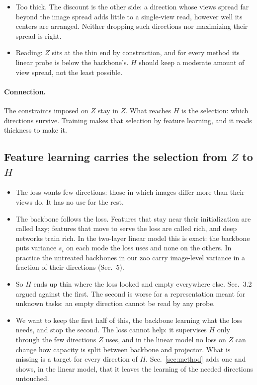 \documentclass[11pt]{article}
\numberwithin{equation}{section}
\theoremstyle{definition}
\theoremstyle{remark}
\begin{document}
\begin{itemize}
    \item Too thick. The discount is the other side: a direction whose views spread far
    beyond the image spread adds little to a single-view read, however well its centers are
    arranged. Neither dropping such directions nor maximizing their spread is right.

    \item Reading: \(Z\) sits at the thin end by construction, and for every method its
    linear probe is below the backbone's. \(H\) should keep a moderate amount of view
    spread, not the least possible.
\end{itemize}

\paragraph{Connection.}
The constraints imposed on \(Z\) stay in \(Z\). What reaches \(H\) is the selection:
which directions survive. Training makes that selection by feature learning, and it reads
thickness to make it.


\subsection{Feature learning carries the selection from \(Z\) to \(H\)}
\begin{itemize}
    \item The loss wants few directions: those in which images differ more than their
    views do. It has no use for the rest.

    \item The backbone follows the loss. Features that stay near their initialization are
    called lazy; features that move to serve the loss are called rich, and deep networks
    train rich. In the two-layer linear model this is exact: the backbone puts variance
    \(s_i\) on each mode the loss uses and none on the others. In practice the untreated
    backbones in our zoo carry image-level variance in a fraction of their directions
    (Sec.~5).

    \item So \(H\) ends up thin where the loss looked and empty everywhere else.
    Sec.~3.2 argued against the first. The second is worse for a representation meant
    for unknown tasks: an empty direction cannot be read by any probe.

    \item We want to keep the first half of this, the backbone learning what the loss
    needs, and stop the second. The loss cannot help: it supervises \(H\) only through
    the few directions \(Z\) uses, and in the linear model no loss on \(Z\) can change
    how capacity is split between backbone and projector. What is missing is a target
    for every direction of \(H\). Sec.~\ref{sec:method} adds one and shows, in the
    linear model, that it leaves the learning of the needed directions untouched.
\end{itemize}
\end{document}
